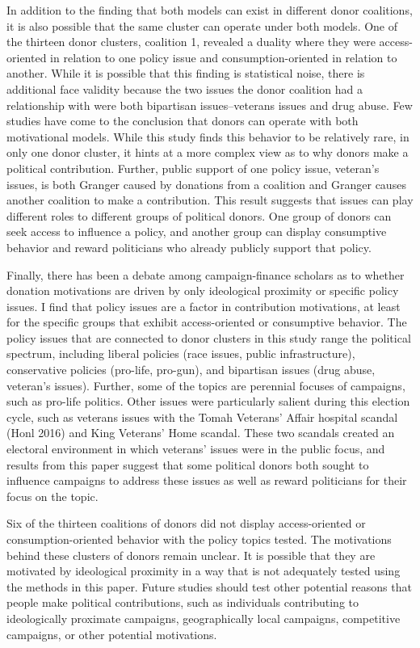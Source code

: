 \documentclass[12pt,]{article}
\begin{document}
In addition to the finding that both models can exist in different donor
coalitions, it is also possible that the same cluster can operate under
both models. One of the thirteen donor clusters, coalition 1, revealed a
duality where they were access-oriented in relation to one policy issue
and consumption-oriented in relation to another. While it is possible
that this finding is statistical noise, there is additional face
validity because the two issues the donor coalition had a relationship
with were both bipartisan issues--veterans issues and drug abuse. Few
studies have come to the conclusion that donors can operate with both
motivational models. While this study finds this behavior to be
relatively rare, in only one donor cluster, it hints at a more complex
view as to why donors make a political contribution. Further, public
support of one policy issue, veteran's issues, is both Granger caused by
donations from a coalition and Granger causes another coalition to make
a contribution. This result suggests that issues can play different
roles to different groups of political donors. One group of donors can
seek access to influence a policy, and another group can display
consumptive behavior and reward politicians who already publicly support
that policy.

Finally, there has been a debate among campaign-finance scholars as to
whether donation motivations are driven by only ideological proximity or
specific policy issues. I find that policy issues are a factor in
contribution motivations, at least for the specific groups that exhibit
access-oriented or consumptive behavior. The policy issues that are
connected to donor clusters in this study range the political spectrum,
including liberal policies (race issues, public infrastructure),
conservative policies (pro-life, pro-gun), and bipartisan issues (drug
abuse, veteran's issues). Further, some of the topics are perennial
focuses of campaigns, such as pro-life politics. Other issues were
particularly salient during this election cycle, such as veterans issues
with the Tomah Veterans' Affair hospital scandal (Honl 2016) and King
Veterans' Home scandal. These two scandals created an electoral
environment in which veterans' issues were in the public focus, and
results from this paper suggest that some political donors both sought
to influence campaigns to address these issues as well as reward
politicians for their focus on the topic.

Six of the thirteen coalitions of donors did not display access-oriented
or consumption-oriented behavior with the policy topics tested. The
motivations behind these clusters of donors remain unclear. It is
possible that they are motivated by ideological proximity in a way that
is not adequately tested using the methods in this paper. Future studies
should test other potential reasons that people make political
contributions, such as individuals contributing to ideologically
proximate campaigns, geographically local campaigns, competitive
campaigns, or other potential motivations.
\end{document}
